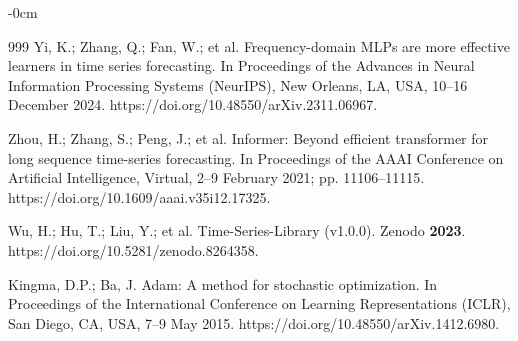 \documentclass[symmetry,article,submit,pdftex,moreauthors]{Definitions/mdpi}
\begin{document}
\begin{adjustwidth}{-\extralength}{0cm}
\begin{thebibliography}{999}
Yi, K.; Zhang, Q.; Fan, W.; et al. Frequency-domain MLPs are more effective learners in time series forecasting. In Proceedings of the Advances in Neural Information Processing Systems (NeurIPS), New Orleans, LA, USA, 10--16 December 2024. https://doi.org/10.48550/arXiv.2311.06967.

Zhou, H.; Zhang, S.; Peng, J.; et al. Informer: Beyond efficient transformer for long sequence time-series forecasting. In Proceedings of the AAAI Conference on Artificial Intelligence, Virtual, 2--9 February 2021; pp. 11106--11115. https://doi.org/10.1609/aaai.v35i12.17325.

Wu, H.; Hu, T.; Liu, Y.; et al. Time-Series-Library (v1.0.0). Zenodo \textbf{2023}. https://doi.org/10.5281/zenodo.8264358.

Kingma, D.P.; Ba, J. Adam: A method for stochastic optimization. In Proceedings of the International Conference on Learning Representations (ICLR), San Diego, CA, USA, 7--9 May 2015. https://doi.org/10.48550/arXiv.1412.6980.

\end{thebibliography}

\end{adjustwidth}
\end{document}
